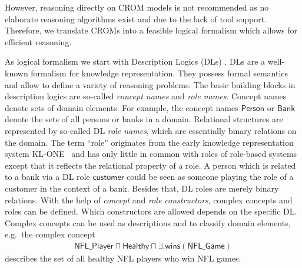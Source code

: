 \documentclass[final]{scrartcl}
\begin{document}
However, reasoning directly on CROM models is not recommended as no elaborate reasoning algorithms
exist and due to the lack of tool support.  Therefore, we translate CROMs into a feasible logical
formalism which allows for efficient reasoning.


As logical formalism we start with Description Logics (DLs) \cite{DLhandbook-07}. DLs are a
well-known formalism for knowledge representation. They possess formal semantics and allow to define
a variety of reasoning problems.
%
The basic building blocks in description logics are so-called \emph{concept names} and \emph{role
  names}. Concept names denote sets of domain elements. For example, the concept names
$\mathsf{Person}$ or $\mathsf{Bank}$ denote the sets of all persons or banks in a domain. Relational
structures are represented by so-called DL \emph{role names}, which are essentially binary relations
on the domain. The term ``role'' originates from the early knowledge representation system
KL-ONE~\cite{WoS-CMA133} and has only little in common with roles of role-based systems except that
it reflects the relational property of a role. A person which is related to a bank via a DL role
$\mathsf{customer}$ could be seen as someone playing the role of a customer in the context of a
bank. Besides that, DL roles are merely binary relations. With the help of \emph{concept} and
\emph{role constructors}, complex concepts and roles can be defined.  Which constructors are allowed
depends on the specific DL. Complex concepts can be used as descriptions and to classify domain
elements, e.g.\ the complex concept
\begin{align}
  \label{eq:1-1}
  \mathsf{NFL\_Player} \sqcap \mathsf{Healthy} \sqcap \exists.\mathsf{wins}(\mathsf{NFL\_Game})
\end{align}
describes the set of all healthy NFL players who win NFL games.
\end{document}

